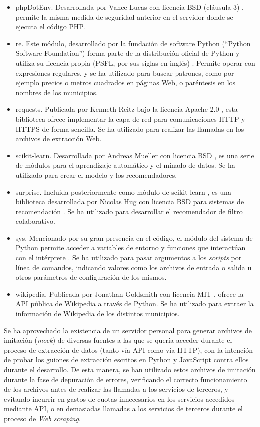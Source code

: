 \begin{itemize}
    \item phpDotEnv. Desarrollada por Vance Lucas con licencia BSD (cláusula 3) \cite{phpdotenv}, permite la misma medida de seguridad anterior en el servidor donde se ejecuta el código PHP.
    \item re. Este módulo, desarrollado por la fundación de software Python (``Python Software Foundation'') forma parte de la distribución oficial de Python y utiliza su licencia propia (PSFL, por sus siglas en inglés) \cite{re}. Permite operar con expresiones regulares, y se ha utilizado para buscar patrones, como por ejemplo precios o metros cuadrados en páginas Web, o paréntesis en los nombres de los municipios.
    \item requests. Publicada por Kenneth Reitz bajo la licencia Apache 2.0 \cite{requests}, esta biblioteca ofrece implementar la capa de red para comunicaciones HTTP y HTTPS de forma sencilla. Se ha utilizado para realizar las llamadas en los archivos de extracción Web.
    \item scikit-learn. Desarrollada por Andreas Mueller con licencia BSD \cite{scikit}, es una serie de módulos para el aprendizaje automático y el minado de datos. Se ha utilizado para crear el modelo y los recomendadores.
    \item surprise. Incluida posteriormente como módulo de scikit-learn \cite{scikit_surprise}, es una biblioteca desarrollada por Nicolas Hug con licencia BSD para sistemas de recomendación \cite{surprise}. Se ha utilizado para desarrollar el recomendador de filtro colaborativo.
    \item sys. Mencionado por su gran presencia en el código, el módulo del sistema de Python permite acceder a variables de entorno y funciones que interactúan con el intérprete \cite{sys}. Se ha utilizado para pasar argumentos a los \textit{scripts} por línea de comandos, indicando valores como los archivos de entrada o salida u otros parámetros de configuración de los mismos.
    \item wikipedia. Publicada por Jonathan Goldsmith con licencia MIT \cite{wikipedia_py}, ofrece la API pública de Wikipedia a través de Python. Se ha utilizado para extraer la información de Wikipedia de los distintos municipios.
\end{itemize}

Se ha aprovechado la existencia de un servidor personal para generar archivos de imitación (\textit{mock}) de diversas fuentes a las que se quería acceder durante el proceso de extracción de datos (tanto vía API como vía HTTP), con la intención de probar los guiones de extracción escritos en Python y JavaScript contra ellos durante el desarrollo. De esta manera, se han utilizado estos archivos de imitación durante la fase de depuración de errores, verificando el correcto funcionamiento de los archivos antes de realizar las llamadas a los servicios de terceros, y evitando incurrir en gastos de cuotas innecesarios en los servicios accedidos mediante API, o en demasiadas llamadas a los servicios de terceros durante el proceso de \textit{Web scraping}.


